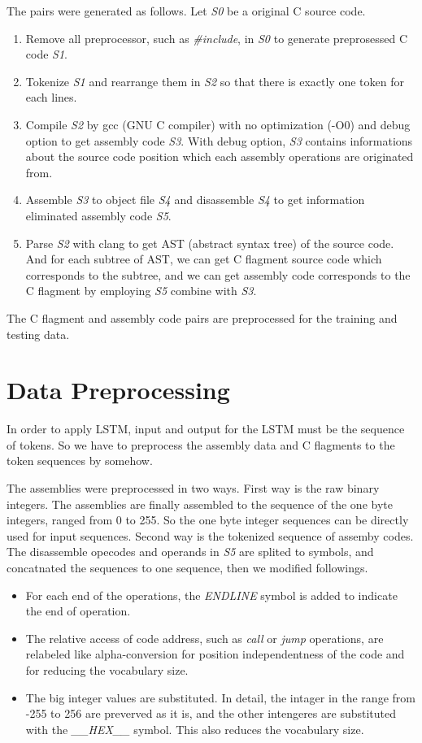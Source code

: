 \documentclass[senior,final,11pt]{iscs-thesis}
\begin{document}
The pairs were generated as follows. Let {\sl S0} be a original C source code.
\begin{enumerate}
\item Remove all preprocessor, such as {\sl \#include}, in {\sl S0} to generate preprosessed C code {\sl S1}. 
\item Tokenize {\sl S1} and rearrange them in {\sl S2} so that there is exactly one token for each lines. 
\item 
Compile {\sl S2} by gcc (GNU C compiler) with no optimization (-O0) and debug option to get assembly code {\sl S3}. 
With debug option, {\sl S3} contains informations about the source code position which each assembly operations are originated from.
\item Assemble {\sl S3} to object file {\sl S4} and disassemble {\sl S4} to get information eliminated assembly code {\sl S5}.
\item 
Parse {\sl S2} with clang to get AST (abstract syntax tree) of the source code. 
And for each subtree of AST, we can get C flagment source code which corresponds to the subtree, 
and we can get assembly code corresponds to the C flagment by employing {\sl S5} combine with {\sl S3}.
\end{enumerate}

The C flagment and assembly code pairs are preprocessed for the training and testing data.


\section{Data Preprocessing}

In order to apply LSTM, input and output for the LSTM must be the sequence of tokens. 
So we have to preprocess the assembly data and C flagments to the token sequences by somehow.

The assemblies were preprocessed in two ways.
First way is the raw binary integers. The assemblies are finally assembled to the sequence of the one byte integers, ranged from 0 to 255.
So the one byte integer sequences can be directly used for input sequences.
Second way is the tokenized sequence of assemby codes. 
The disassemble opecodes and operands in {\sl S5} are splited to symbols, and concatnated the sequences to one sequence, then we modified followings.
\begin{itemize}
\item For each end of the operations, the {\sl ENDLINE} symbol is added to indicate the end of operation.
\item 
The relative access of code address, such as {\sl call} or {\sl jump} operations, 
are relabeled like alpha-conversion for position independentness of the code and for reducing the vocabulary size.
\item The big integer values are substituted. 
In detail, the intager in the range from -255 to 256 are preverved as it is, and the other intengeres are substituted with the {\sl \_\_HEX\_\_} symbol.
This also reduces the vocabulary size.
\end{itemize}
\end{document}
